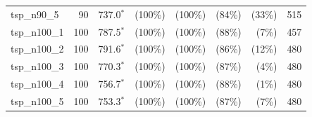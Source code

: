 \begin{longtable}{lrrrrrrr}
tsp\_n90\_5 & 90 & 737.0$^*$ & (100\%) & (100\%) & (84\%) & (33\%) & 515 \\
tsp\_n100\_1 & 100 & 787.5$^*$ & (100\%) & (100\%) & (88\%) & (7\%) & 457 \\
tsp\_n100\_2 & 100 & 791.6$^*$ & (100\%) & (100\%) & (86\%) & (12\%) & 480 \\
tsp\_n100\_3 & 100 & 770.3$^*$ & (100\%) & (100\%) & (87\%) & (4\%) & 480 \\
tsp\_n100\_4 & 100 & 756.7$^*$ & (100\%) & (100\%) & (88\%) & (1\%) & 480 \\
tsp\_n100\_5 & 100 & 753.3$^*$ & (100\%) & (100\%) & (87\%) & (7\%) & 480 \\
\bottomrule
\end{longtable}

